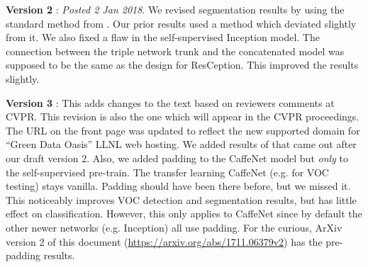 \documentclass[10pt,twocolumn,letterpaper]{article}
\begin{document}
{\bf Version 2} : \emph{Posted 2 Jan 2018}. We revised segmentation results by using the standard method from \cite{Long15}. Our prior results used a method which deviated slightly from it. We also fixed a flaw in the self-supervised Inception model. The connection between the triple network trunk and the concatenated model was supposed to be the same as the design for ResCeption. This improved the results slightly. 

{\bf Version 3} : This adds changes to the text based on reviewers comments at CVPR. This revision is also the one which will appear in the CVPR proceedings. The URL on the front page was updated to reflect the new supported domain for ``Green Data Oasis'' LLNL web hosting. We added results of \cite{Kim18} that came out after our draft version 2. Also, we added padding to the CaffeNet model but \emph{only} to the self-supervised pre-train. The transfer learning CaffeNet (e.g. for VOC testing) stays vanilla. Padding should have been there before, but we missed it. This noticeably improves VOC detection and segmentation results, but has little effect on classification. However, this only applies to CaffeNet since by default the other newer networks (e.g. Inception) all use padding. For the curious, ArXiv version 2 of this document (\url{https://arxiv.org/abs/1711.06379v2}) has the pre-padding results.  
\end{document}
